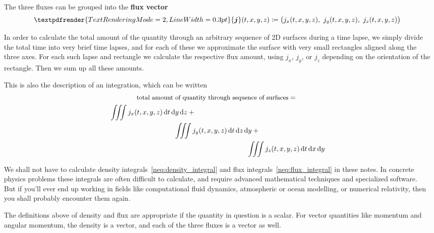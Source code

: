 \documentclass[a4paper,12pt,%
onecolumn,oneside,titlepage,%
british%
]{memoir}
\renewcommand*{\bm}[1]{\textpdfrender{TextRenderingMode=2,LineWidth=0.3pt}{\boldsymbol{#1}}}
\newcommand*{\di}{\mathrm{d}}%
\newcommand*{\defd}{\coloneqq}
\renewcommand*{\|}[1][]{\nonscript\:#1\vert\nonscript\:\mathopen{}}
\newcommand*{\yN}{N}
\newcommand*{\yJ}{J}
\newcommand*{\yti}{t_{0}}
\begin{document}
The three fluxes can be grouped into the \textbf{flux vector}
\begin{equation}
  \label{neq:flux_vector}
  \bm{j}(t,x,y,z) \defd
  \bigl(j_{x}(t,x,y,z),\ j_{y}(t,x,y,z),\ j_{z}(t,x,y,z)\bigr)
\end{equation}

In order to calculate the total amount of the quantity through an arbitrary sequence of 2D surfaces during a time lapse, we simply divide the total time into very brief time lapses, and for each of these we approximate the surface with very small rectangles aligned along the three axes. For each such lapse and rectangle we calculate the respective flux amount, using $j_{x}$, $j_{y}$, or $j_{z}$ depending on the orientation of the rectangle. Then we sum up all these amounts.
\begin{extra}
  This is also the description of an integration, which can be written
  \begin{multline}
    \label{neq:flux_integral}
    \text{\small total amount of quantity through sequence of surfaces} = {}\\
    \begin{multlined}[b][0.9\linewidth]
      \iiint j_{x}(t,x,y,z)\, \di t\, \di y\, \di z +{}
      \\\iiint j_{y}(t,x,y,z)\, \di t\, \di z\, \di y +{}
      \\\iiint j_{z}(t,x,y,z)\, \di t\, \di x\, \di y
    \end{multlined}
  \end{multline}

  We shall not have to calculate density integrals~\eqref{neq:density_integral} and flux integrals~\eqref{neq:flux_integral} in these notes. In concrete physics problems these integrals are often difficult to calculate, and require advanced mathematical techniques and specialized software. But if you'll ever end up working in fields like computational fluid dynamics, atmospheric or ocean modelling, or numerical relativity, then you shall probably encounter them again.
\end{extra}

\medskip

The definitions above of density and flux are appropriate if the quantity in question is a scalar. For vector quantities like momentum and angular momentum, the density is a vector, and each of the three fluxes is a vector as well.
\end{document}
